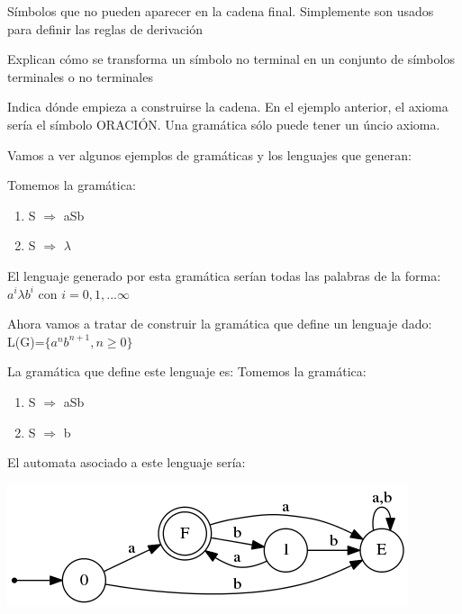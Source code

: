 \documentclass{apuntes}
\begin{document}
\begin{defn}
Símbolos que no pueden aparecer en la cadena final. Simplemente son usados para definir las reglas de derivación
\end{defn}

\begin{defn}
Explican cómo se transforma un símbolo no terminal en un conjunto de símbolos terminales o no terminales
\end{defn}

\begin{defn}
Indica dónde empieza a construirse la cadena. En el ejemplo anterior, el axioma sería el símbolo ORACIÓN. Una gramática sólo puede tener un úncio axioma.
\end{defn}

Vamos a ver algunos ejemplos de gramáticas y los lenguajes que generan:
\begin{example}
Tomemos la gramática:
\begin{enumerate}
\item S $\Rightarrow$ aSb
\item S $\Rightarrow$ $\lambda$
\end{enumerate}

El lenguaje generado por esta gramática serían todas las palabras de la forma: $a^i\lambda b^i$ con $ i=0,1,... \infty$
\end{example}

\begin{example}
Ahora vamos a tratar de construir la gramática que define un lenguaje dado:
L(G)=$\lbrace a^nb^{n+1}, n \geq 0 \rbrace$

La gramática que define este lenguaje es:
Tomemos la gramática:
\begin{enumerate}
\item S $\Rightarrow$ aSb
\item S $\Rightarrow$ b
\end{enumerate}

El automata asociado a este lenguaje sería:
\begin{center}
\includegraphics[scale=0.75]{automata1.png}
\end{center}
\end{example}
\end{document}
